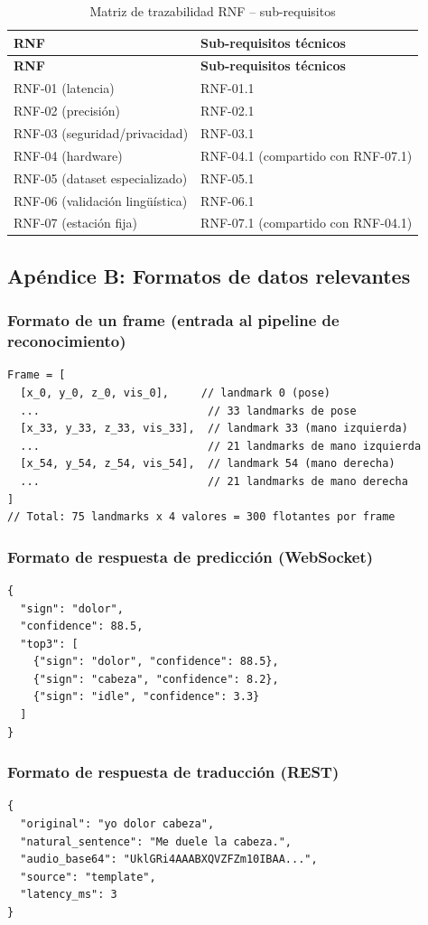 \small
\begin{longtable}{>{\raggedright\arraybackslash}p{3.4cm} >{\raggedright\arraybackslash}p{10.2cm}}
    \caption{Matriz de trazabilidad RNF -- sub-requisitos}
    \label{tab:trazabilidad-rnf} \\
    \toprule
    \textbf{RNF} & \textbf{Sub-requisitos técnicos} \\
    \midrule
    \endfirsthead
    \toprule
    \textbf{RNF} & \textbf{Sub-requisitos técnicos} \\
    \midrule
    \endhead
    RNF-01 (latencia) & RNF-01.1 \\
    RNF-02 (precisión) & RNF-02.1 \\
    RNF-03 (seguridad/privacidad) & RNF-03.1 \\
    RNF-04 (hardware) & RNF-04.1 (compartido con RNF-07.1) \\
    RNF-05 (dataset especializado) & RNF-05.1 \\
    RNF-06 (validación lingüística) & RNF-06.1 \\
    RNF-07 (estación fija) & RNF-07.1 (compartido con RNF-04.1) \\
    \bottomrule
\end{longtable}

\subsection{Apéndice B: Formatos de datos relevantes}

\subsubsection{Formato de un frame (entrada al pipeline de reconocimiento)}
\begin{verbatim}
Frame = [
  [x_0, y_0, z_0, vis_0],     // landmark 0 (pose)
  ...                          // 33 landmarks de pose
  [x_33, y_33, z_33, vis_33],  // landmark 33 (mano izquierda)
  ...                          // 21 landmarks de mano izquierda
  [x_54, y_54, z_54, vis_54],  // landmark 54 (mano derecha)
  ...                          // 21 landmarks de mano derecha
]
// Total: 75 landmarks x 4 valores = 300 flotantes por frame
\end{verbatim}

\subsubsection{Formato de respuesta de predicción (WebSocket)}
\begin{verbatim}
{
  "sign": "dolor",
  "confidence": 88.5,
  "top3": [
    {"sign": "dolor", "confidence": 88.5},
    {"sign": "cabeza", "confidence": 8.2},
    {"sign": "idle", "confidence": 3.3}
  ]
}
\end{verbatim}

\subsubsection{Formato de respuesta de traducción (REST)}
\begin{verbatim}
{
  "original": "yo dolor cabeza",
  "natural_sentence": "Me duele la cabeza.",
  "audio_base64": "UklGRi4AAABXQVZFZm10IBAA...",
  "source": "template",
  "latency_ms": 3
}
\end{verbatim}
